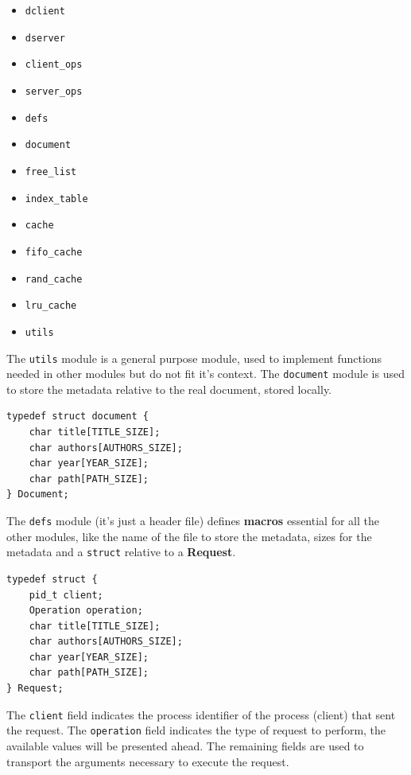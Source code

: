 \documentclass[a4paper, 11pt]{article}
\begin{document}
\begin{multicols}{2}
\begin{itemize}
    \item \texttt{dclient}
    \item \texttt{dserver}
    \item \texttt{client\_ops}
    \item \texttt{server\_ops}
    \item \texttt{defs}
    \item \texttt{document}
    \item \texttt{free\_list}
    \item \texttt{index\_table}
    \item \texttt{cache}
    \item \texttt{fifo\_cache}
    \item \texttt{rand\_cache}
    \item \texttt{lru\_cache}
    \item \texttt{utils}
\end{itemize}
\end{multicols}

\noindent The \texttt{utils} module is a general purpose module, used to implement functions needed in other modules but do not fit it's context. The \texttt{document} module is used to store the metadata relative to the real document, stored locally.

\begin{Verbatim}[xleftmargin=2em]
typedef struct document {
    char title[TITLE_SIZE];
    char authors[AUTHORS_SIZE];
    char year[YEAR_SIZE];
    char path[PATH_SIZE];
} Document;
\end{Verbatim}

\noindent The \texttt{defs} module (it's just a header file) defines \textbf{macros} essential for all the other modules, like the name of the file to store the metadata, sizes for the metadata and a \texttt{struct} relative to a \textbf{Request}.

\begin{Verbatim}[xleftmargin=2em]
typedef struct {
    pid_t client;
    Operation operation;
    char title[TITLE_SIZE];
    char authors[AUTHORS_SIZE];
    char year[YEAR_SIZE];
    char path[PATH_SIZE];
} Request;
\end{Verbatim}

\noindent The \texttt{client} field indicates the process identifier of the process (client) that sent the request. The \texttt{operation} field indicates the type of request to perform, the available values will be presented ahead. The remaining fields are used to transport the arguments necessary to execute the request.
\end{document}
